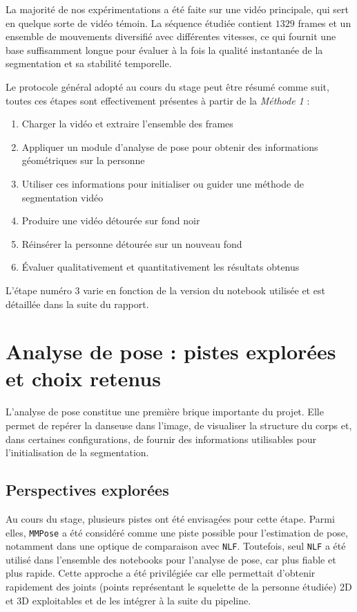 \documentclass[11pt,a4paper]{article}
\begin{document}
La majorité de nos expérimentations a été faite sur une vidéo principale, qui sert en quelque sorte de vidéo témoin.
La séquence étudiée contient $1329$ frames et un ensemble de mouvements diversifié avec différentes vitesses, ce qui fournit une base suffisamment longue pour évaluer à la fois la qualité instantanée de la segmentation et sa stabilité temporelle.

Le protocole général adopté au cours du stage peut être résumé comme suit, toutes ces étapes sont effectivement présentes à partir de la \textit{Méthode 1} :
\begin{enumerate}
    \item Charger la vidéo et extraire l'ensemble des frames
    \item Appliquer un module d'analyse de pose pour obtenir des informations géométriques sur la personne
    \item Utiliser ces informations pour initialiser ou guider une méthode de segmentation vidéo
    \item Produire une vidéo détourée sur fond noir
    \item Réinsérer la personne détourée sur un nouveau fond
    \item Évaluer qualitativement et quantitativement les résultats obtenus
\end{enumerate}

L'étape numéro 3 varie en fonction de la version du notebook utilisée et est détaillée dans la suite du rapport.

\newpage

\section{Analyse de pose : pistes explorées et choix retenus}
L'analyse de pose constitue une première brique importante du projet.
Elle permet de repérer la danseuse dans l'image, de visualiser la structure du corps et, dans certaines configurations, de fournir des informations utilisables pour l'initialisation de la segmentation.

\subsection{Perspectives explorées}
Au cours du stage, plusieurs pistes ont été envisagées pour cette étape.
Parmi elles, \texttt{MMPose} a été considéré comme une piste possible pour l'estimation de pose, notamment dans une optique de comparaison avec \texttt{NLF}.
Toutefois, seul \texttt{NLF} a été utilisé dans l'ensemble des notebooks pour l'analyse de pose, car plus fiable et plus rapide.
Cette approche a été privilégiée car elle permettait d'obtenir rapidement des joints (points représentant le squelette de la personne étudiée) 2D et 3D exploitables et de les intégrer à la suite du pipeline.
\end{document}
